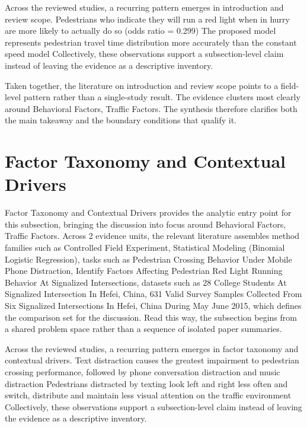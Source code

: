 \documentclass{article}
\begin{document}
Across the reviewed studies, a recurring pattern emerges in introduction and review scope. Pedestrians who indicate they will run a red light when in hurry are more likely to actually do so (odds ratio = 0.299) The proposed model represents pedestrian travel time distribution more accurately than the constant speed model Collectively, these observations support a subsection-level claim instead of leaving the evidence as a descriptive inventory. \cite{12_2016_zhang_aap,17_2017_chen_aap,08_2016_zhou_aap}

Taken together, the literature on introduction and review scope points to a field-level pattern rather than a single-study result. The evidence clusters most clearly around Behavioral Factors, Traffic Factors. The synthesis therefore clarifies both the main takeaway and the boundary conditions that qualify it. \cite{12_2016_zhang_aap,17_2017_chen_aap}

\section{Factor Taxonomy and Contextual Drivers}
Factor Taxonomy and Contextual Drivers provides the analytic entry point for this subsection, bringing the discussion into focus around Behavioral Factors, Traffic Factors. Across 2 evidence units, the relevant literature assembles method families such as Controlled Field Experiment, Statistical Modeling (Binomial Logistic Regression), tasks such as Pedestrian Crossing Behavior Under Mobile Phone Distraction, Identify Factors Affecting Pedestrian Red Light Running Behavior At Signalized Intersections, datasets such as 28 College Students At Signalized Intersection In Hefei, China, 631 Valid Survey Samples Collected From Six Signalized Intersections In Hefei, China During May June 2015, which defines the comparison set for the discussion. Read this way, the subsection begins from a shared problem space rather than a sequence of isolated paper summaries. \cite{09_2018_jiang_aap,12_2016_zhang_aap}

Across the reviewed studies, a recurring pattern emerges in factor taxonomy and contextual drivers. Text distraction causes the greatest impairment to pedestrian crossing performance, followed by phone conversation distraction and music distraction Pedestrians distracted by texting look left and right less often and switch, distribute and maintain less visual attention on the traffic environment Collectively, these observations support a subsection-level claim instead of leaving the evidence as a descriptive inventory. \cite{09_2018_jiang_aap,12_2016_zhang_aap}
\end{document}
